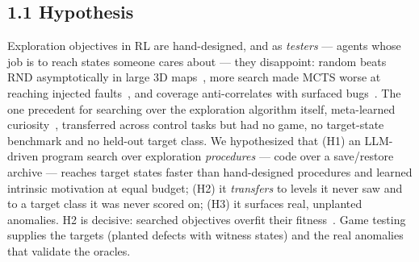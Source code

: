 
\subsection*{1.1 Hypothesis}
Exploration objectives in RL are hand-designed, and as \emph{testers} --- agents whose job is to reach states someone cares about ---
they disappoint: random beats RND asymptotically in large 3D maps~\cite{goexplore-reach}, more search made MCTS worse at reaching
injected faults~\cite{ariyurek-mcts}, and coverage anti-correlates with surfaced bugs~\cite{ccpt}. The one precedent for searching over the exploration algorithm itself, meta-learned curiosity~\cite{alet},
transferred across control tasks but had no game, no target-state benchmark and no held-out target class. We hypothesized that (H1)
an LLM-driven program search over exploration \emph{procedures} --- code over a save/restore archive --- reaches target states faster
than hand-designed procedures and learned intrinsic motivation at equal budget; (H2) it \emph{transfers} to levels it never saw and to a target class it was
never scored on; (H3) it surfaces real, unplanted anomalies. H2 is decisive: searched objectives overfit their fitness~\cite{dmmultiagent}.
Game testing supplies the targets (planted defects with witness states) and the real anomalies that validate the oracles.
